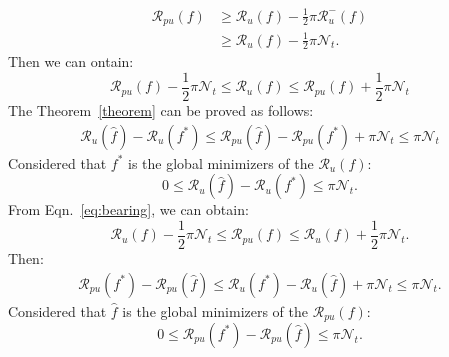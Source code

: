 \begin{IEEEproof}
    \begin{equation}\nonumber
        \begin{aligned}
            {\mathcal{R}_{pu}(f)} &\geq {\mathcal{R}_{u}(f)}-\frac{1}{2}{\pi}{\mathcal{R}_{u}^{-}(f)}\\
                                  &\geq {\mathcal{R}_{u}(f)}-\frac{1}{2}{{\pi}\mathcal{N}_{t}}.
        \end{aligned}
    \end{equation}
    Then we can ontain:
    \begin{equation}
        {\mathcal{R}_{pu}(f)}-{\frac{1}{2}\pi}{\mathcal{N}_t} \leq {\mathcal{R}_{u}(f)} \leq {\mathcal{R}_{pu}(f)}+{\frac{1}{2}{\pi}\mathcal{N}_{t}}
    \label{eq:bearing}
    \end{equation}
    The Theorem~\ref{theorem} can be proved as follows:
    \begin{equation}\nonumber
        \begin{aligned}
            {\mathcal{R}_{u}(\hat{f})}-{\mathcal{R}_{u}(f^{*})} \leq {\mathcal{R}_{pu}(\hat{f})}-{\mathcal{R}_{pu}(f^{*})}+{\pi}\mathcal{N}_{t} \leq {\pi}{\mathcal{N}_{t}}
        \end{aligned}
    \end{equation}
    Considered that $f^{*}$ is the global minimizers of the $\mathcal{R}_{u}(f)$:
    \begin{equation}\nonumber
        0 \leq {\mathcal{R}_{u}(\hat{f})}-{\mathcal{R}_{u}(f^{*})} \leq {{\pi}\mathcal{N}_{t}}.
    \end{equation}
    From Eqn.~\ref{eq:bearing}, we can obtain:
    \begin{equation}\nonumber
        {\mathcal{R}_{u}(f)}-{\frac{1}{2}{\pi}\mathcal{N}_{t}} \leq {\mathcal{R}_{pu}(f)} \leq {\mathcal{R}_{u}(f)}+{\frac{1}{2}{\pi}\mathcal{N}_{t}}.
    \end{equation}
    Then:
    \begin{equation}\nonumber
        \begin{aligned}
            {\mathcal{R}_{pu}(f^{*})}-{\mathcal{R}_{pu}(\hat{f})} \leq {\mathcal{R}_{u}(f^{*})}-{\mathcal{R}_{u}(\hat{f})}+{{\pi}\mathcal{N}_{t}} \leq {{\pi}\mathcal{N}_{t}}.
        \end{aligned}
    \end{equation}
    Considered that $\hat{f}$ is the global minimizers of the $\mathcal{R}_{pu}(f)$:
    \begin{equation}\nonumber
        0 \leq {\mathcal{R}_{pu}(f^{*})}-{\mathcal{R}_{pu}(\hat{f})} \leq {{\pi}\mathcal{N}_{t}}.
    \end{equation}
\end{IEEEproof}